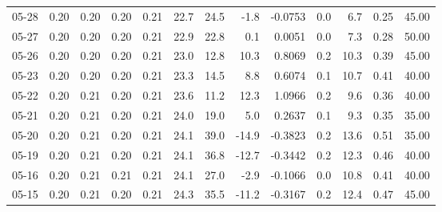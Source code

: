 \begin{threeparttable}
{\begin{tabular}{lrrrrrrrrrrrr}
  05-28 &          0.20 &          0.20 &          0.20 &        0.21 &                22.7 &                24.5 &       -1.8 &      -0.0753 &                 0.0 &              6.7 &            0.25 &                  45.00 \\
  05-27 &          0.20 &          0.20 &          0.20 &        0.21 &                22.9 &                22.8 &        0.1 &       0.0051 &                 0.0 &              7.3 &            0.28 &                  50.00 \\
  05-26 &          0.20 &          0.20 &          0.20 &        0.21 &                23.0 &                12.8 &       10.3 &       0.8069 &                 0.2 &             10.3 &            0.39 &                  45.00 \\
  05-23 &          0.20 &          0.20 &          0.20 &        0.21 &                23.3 &                14.5 &        8.8 &       0.6074 &                 0.1 &             10.7 &            0.41 &                  40.00 \\
  05-22 &          0.20 &          0.21 &          0.20 &        0.21 &                23.6 &                11.2 &       12.3 &       1.0966 &                 0.2 &              9.6 &            0.36 &                  40.00 \\
  05-21 &          0.20 &          0.21 &          0.20 &        0.21 &                24.0 &                19.0 &        5.0 &       0.2637 &                 0.1 &              9.3 &            0.35 &                  35.00 \\
  05-20 &          0.20 &          0.21 &          0.20 &        0.21 &                24.1 &                39.0 &      -14.9 &      -0.3823 &                 0.2 &             13.6 &            0.51 &                  35.00 \\
  05-19 &          0.20 &          0.21 &          0.20 &        0.21 &                24.1 &                36.8 &      -12.7 &      -0.3442 &                 0.2 &             12.3 &            0.46 &                  40.00 \\
  05-16 &          0.20 &          0.21 &          0.21 &        0.21 &                24.1 &                27.0 &       -2.9 &      -0.1066 &                 0.0 &             10.8 &            0.41 &                  40.00 \\
  05-15 &          0.20 &          0.21 &          0.20 &        0.21 &                24.3 &                35.5 &      -11.2 &      -0.3167 &                 0.2 &             12.4 &            0.47 &                  45.00 \\

\end{tabular}}
\end{threeparttable}
